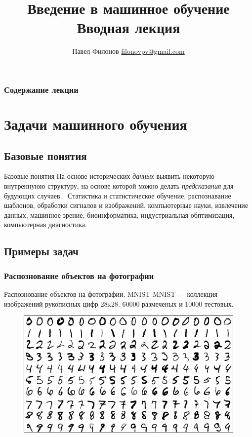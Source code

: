 \documentclass{beamer}
\title{Введение в машинное обучение \\ Вводная лекция}
\author{Павел Филонов \href{mailto:filonovpv@gmail.com}{filonovpv@gmail.com}}
\begin{document}
\begin{frame}
    \titlepage
\end{frame}

\begin{frame}
    \frametitle{Содержание лекции}
    \tableofcontents
\end{frame}

\section{Задачи машинного обучения}
\subsection{Базовые понятия}
\begin{frame}{Базовые понятия}
    На основе исторических {\it данных} выявить некоторую внутреннуюю структуру, на основе которой можно делать {\it предсказания} для будующих случаев.
    \
    Статистика и статистическое обучение, распознавание шаблонов, обработки сигналов и изображений, компьютерные науки, извлечение данных, машинное зрение, биоинформатика, индустриальная обптимизация, компьютерная диагностика.
\end{frame}

\subsection{Примеры задач}
\subsubsection{Распознование объектов на фотографии}
\begin{frame}{Распознование объектов на фотографии. MNIST}
    MNIST --- коллекция изображений рукописных цифр 28x28. 60000 размеченых и 10000 тестовых.
    \begin{figure}
        \includegraphics[width=\linewidth]{fig/mnist.png}
    \end{figure}
\end{frame}
\end{document}
